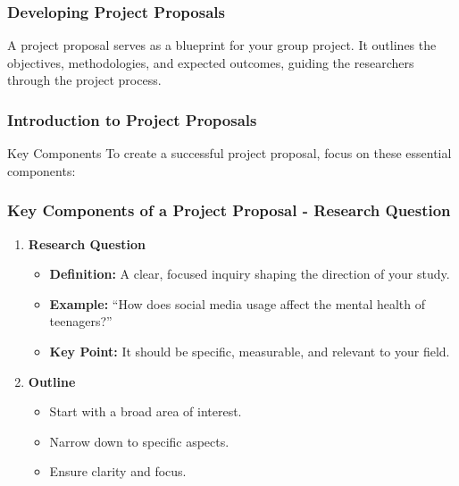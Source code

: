 \documentclass[aspectratio=169]{beamer}
\begin{document}
\begin{frame}[fragile]
    \frametitle{Developing Project Proposals}
    A project proposal serves as a blueprint for your group project. 
    It outlines the objectives, methodologies, and expected outcomes, guiding the researchers through the project process.
\end{frame}

\begin{frame}[fragile]
    \frametitle{Introduction to Project Proposals}
    \begin{block}{Key Components}
        To create a successful project proposal, focus on these essential components:
    \end{block}
\end{frame}

\begin{frame}[fragile]
    \frametitle{Key Components of a Project Proposal - Research Question}
    \begin{enumerate}
        \item \textbf{Research Question}
        \begin{itemize}
            \item \textbf{Definition:} A clear, focused inquiry shaping the direction of your study.
            \item \textbf{Example:} ``How does social media usage affect the mental health of teenagers?''
            \item \textbf{Key Point:} It should be specific, measurable, and relevant to your field.
        \end{itemize}
        \item \textbf{Outline}
        \begin{itemize}
            \item Start with a broad area of interest.
            \item Narrow down to specific aspects.
            \item Ensure clarity and focus.
        \end{itemize}
    \end{enumerate}
\end{frame}
\end{document}
